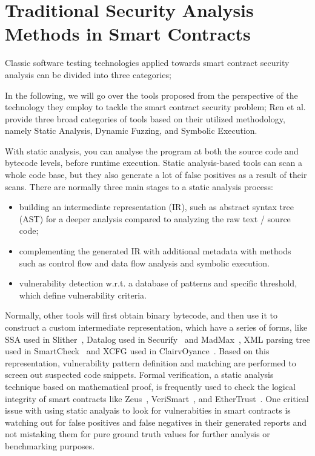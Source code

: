 \section{Traditional Security Analysis Methods in Smart Contracts}

Classic software testing technologies applied towards smart contract security analysis can be divided into three categories;

In the following, we will go over the tools proposed from the perspective of the technology they employ to tackle the smart contract security problem;
Ren et al.~\cite{Empirical-Evaluation-of-Smart-Contract-Testing:What-is-the-Best-Choice} provide three broad categories of tools based on their utilized methodology,
namely Static Analysis, Dynamic Fuzzing, and Symbolic Execution.

With static analysis, you can analyse the program at both the source code and bytecode levels, before runtime execution.
Static analysis-based tools can scan a whole code base, but they also generate a lot of false positives as a result of their scans.
There are normally three main stages to a static analysis process:
\begin{itemize}
  \item building an intermediate representation (IR), such as abstract syntax tree (AST) for a deeper analysis compared to analyzing the raw text / source code;
  \item complementing the generated IR with additional metadata with methods such as control flow and data flow analysis and symbolic execution.
  \item vulnerability detection w.r.t. a database of patterns and specific threshold, which define vulnerability criteria.
\end{itemize}
Normally, other tools will first obtain binary bytecode, and then use it to construct a custom intermediate representation, which have a series of forms,
like SSA used in Slither~\cite{slither}, Datalog used in Securify~\cite{securify} and MadMax~\cite{madmax}, XML parsing tree used in SmartCheck~\cite{smartcheck} and
XCFG used in ClairvOyance~\cite{ClairvOyance}.
Based on this representation, vulnerability pattern definition and matching are performed to screen out suspected code snippets.
Formal verification, a static analysis technique based on mathematical proof, is frequently used to check the logical integrity of smart contracts
like Zeus~\cite{kalra2018zeus}, VeriSmart~\cite{verismart}, and EtherTrust~\cite{etehrTrust}.
One critical issue with using static analyais to look for vulnerabities in smart contracts is watching out for false positives and false negatives in their
generated reports and not mistaking them for pure ground truth values for further analysis or benchmarking  purposes.

